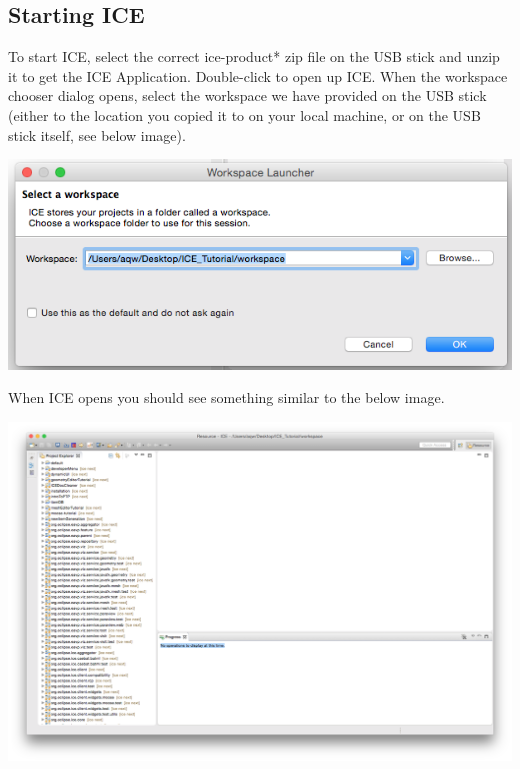 \documentclass{article}
\begin{document}
\subsection*{Starting ICE}
To start ICE, select the correct ice-product* zip file on the USB stick and
unzip it to get the ICE Application. Double-click to open up ICE. When the workspace chooser
dialog opens, select the workspace we have provided on the USB stick (either to
the location you copied it to on your local machine, or on the USB stick
itself, see below image). 
\begin{center} \includegraphics[width=\textwidth]{figures/workspace}
\end{center}
When ICE opens you should see something similar to the below image. 
\begin{center} \includegraphics[width=\textwidth]{figures/expectedICE}
\end{center} 
\end{document}
